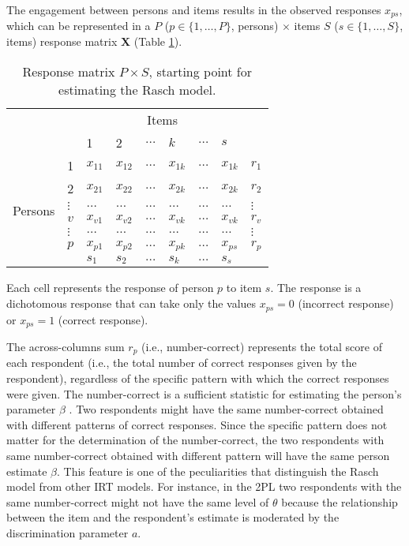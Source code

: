 \documentclass[12pt]{book}
\begin{document}
The engagement between persons and items results in the observed responses $x_{ps}$, which can be represented in a $P$ ($p \in \{1, \ldots, P\}$, persons) $\times$ items $S$ ($s\in \{1, \ldots, S\}$, items) response matrix $\bm{X}$ (Table \ref{tab:rasch}). 

\begin{table}[h!]
	\centering
	\caption{\label{tab:rasch} Response matrix $P \times S$, starting point for estimating the Rasch model.}
	\begin{tabular}{p{1cm}  p{1cm}  |p{1.5cm}  p{1.5cm} p{1.5cm} p{1.5cm} p{1.5cm} p{1.5cm} | p{1.5cm}}
		& \multicolumn{1}{l}{} & \multicolumn{6}{c}{Items} & \multicolumn{1}{c}{} \\
		& \multicolumn{1}{c}{} & \multicolumn{1}{l}{1} & \multicolumn{1}{l}{2} & \multicolumn{1}{l}{$\ldots$} & 
		\multicolumn{1}{l}{$k$} & \multicolumn{1}{l}{$\ldots$} & \multicolumn{1}{l}{$s$}& \\
		\cline{3-8}
		\multirow{8}{*}{Persons} & 1 & $x_{11}$ & $x_{12}$ & $\ldots$& $x_{1k}$ & $\ldots$ & $x_{1k}$ & $r_1$ \\
		&	2 & $x_{21}$ & $x_{22}$ & $\ldots$& $x_{2k}$ & $\ldots$ & $x_{2k}$ & $r_2$ \\
		&	$\vdots$ & $\ldots$ & $\ldots$ & $\ldots$ & $\ldots$ & $\ldots$ & $\ldots$ & $\vdots$ \\
		&	$v$ & $x_{v1}$ & $x_{v2}$ & $\ldots$& $x_{vk}$ & $\ldots$ & $x_{vk}$ & $r_v$ \\
		&	$\vdots$ & $\ldots$ & $\ldots$ & $\ldots$ & $\ldots$ & $\ldots$ & $\ldots$ & $\vdots$ \\
		&	$p$ & $x_{p1}$ & $x_{p2}$ & $\ldots$& $x_{pk}$ & $\ldots$ & $x_{ps}$ & $r_p$ \\
		\cline{3-8}
		& \multicolumn{1}{c}{} & $s_1$ &  $s_2$ & $\ldots$ & $s_k$ & $\ldots$  & \multicolumn{2}{l}{$s_s$}\\ 
	\end{tabular}
\end{table}

Each cell represents the response of person $p$ to item $s$. 
The response is a dichotomous response that can take only the values $x_{ps} = 0$ (incorrect response) or $x_{ps} = 1$ (correct response). 

The across-columns sum $r_p$ (i.e., number-correct) represents the total score of each respondent (i.e., the total number of correct responses given by the respondent), regardless of the specific pattern with which the correct responses were given.
The number-correct is a sufficient statistic for estimating the person's parameter $\beta$ \cite{wright1979, wright1997}. 
Two respondents might have the same number-correct obtained with different patterns of correct responses. Since the specific pattern does not matter for the determination of the number-correct, the two respondents with same number-correct obtained with different pattern will have the same person estimate $\beta$. 
This feature is one of the peculiarities that distinguish the Rasch model from other IRT models. For instance, in the 2PL two respondents with the same number-correct might not have the same level of $\theta$ because the relationship between the item and the respondent's estimate is moderated by the discrimination parameter $a$.
\end{document}
